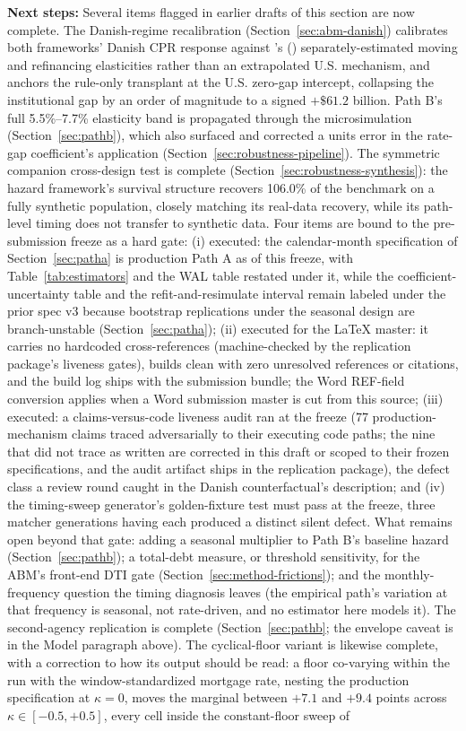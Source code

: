 \documentclass[12pt]{article}
\newcommand{\citepos}[1]{\citeauthor{#1}'s (\citeyear{#1})}
\begin{document}
\textbf{Next steps:} Several items flagged in earlier drafts of this section are now complete. The Danish-regime recalibration (Section~\ref{sec:abm-danish}) calibrates both frameworks' Danish CPR response against \citepos{berger2026} separately-estimated moving and refinancing elasticities rather than an extrapolated U.S. mechanism, and anchors the rule-only transplant at the U.S. zero-gap intercept, collapsing the institutional gap by an order of magnitude to a signed $+\$61.2$ billion. Path B's full 5.5\%--7.7\% elasticity band is propagated through the microsimulation (Section~\ref{sec:pathb}), which also surfaced and corrected a units error in the rate-gap coefficient's application (Section~\ref{sec:robustness-pipeline}). The symmetric companion cross-design test is complete (Section~\ref{sec:robustness-synthesis}): the hazard framework's survival structure recovers 106.0\% of the benchmark on a fully synthetic population, closely matching its real-data recovery, while its path-level timing does not transfer to synthetic data. Four items are bound to the pre-submission freeze as a hard gate: (i) executed: the calendar-month specification of Section~\ref{sec:patha} is production Path A as of this freeze, with Table~\ref{tab:estimators} and the WAL table restated under it, while the coefficient-uncertainty table and the refit-and-resimulate interval remain labeled under the prior spec v3 because bootstrap replications under the seasonal design are branch-unstable (Section~\ref{sec:patha}); (ii) executed for the LaTeX master: it carries no hardcoded cross-references (machine-checked by the replication package's liveness gates), builds clean with zero unresolved references or citations, and the build log ships with the submission bundle; the Word REF-field conversion applies when a Word submission master is cut from this source; (iii) executed: a claims-versus-code liveness audit ran at the freeze (77 production-mechanism claims traced adversarially to their executing code paths; the nine that did not trace as written are corrected in this draft or scoped to their frozen specifications, and the audit artifact ships in the replication package), the defect class a review round caught in the Danish counterfactual's description; and (iv) the timing-sweep generator's golden-fixture test must pass at the freeze, three matcher generations having each produced a distinct silent defect. What remains open beyond that gate: adding a seasonal multiplier to Path B's baseline hazard (Section~\ref{sec:pathb}); a total-debt measure, or threshold sensitivity, for the ABM's front-end DTI gate (Section~\ref{sec:method-frictions}); and the monthly-frequency question the timing diagnosis leaves (the empirical path's variation at that frequency is seasonal, not rate-driven, and no estimator here models it). The second-agency replication is complete (Section~\ref{sec:pathb}; the envelope caveat is in the Model paragraph above). The cyclical-floor variant is likewise complete, with a correction to how its output should be read: a floor co-varying within the run with the window-standardized mortgage rate, nesting the production specification at $\kappa = 0$, moves the marginal between $+7.1$ and $+9.4$ points across $\kappa \in [-0.5, +0.5]$, every cell inside the constant-floor sweep of 
\end{document}
